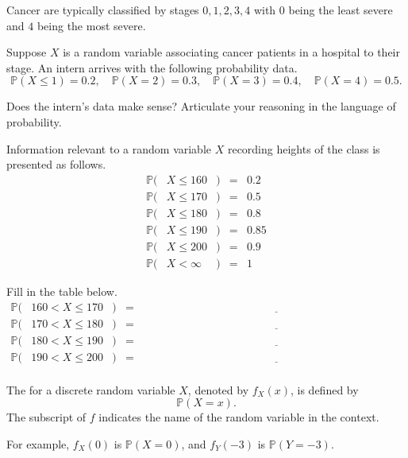 \documentclass[../main.tex]{subfiles}
\begin{document}
\begin{example}
  Cancer are typically classified by stages \(0,1,2,3,4\) with \(0\) being the least severe and \(4\) being the most severe. 

  Suppose \(X\) is a random variable associating cancer patients in a hospital to their stage. An intern arrives with the following probability data. 
  \[
    \mathbb{P}(X \le 1) = 0.2, \quad
    \mathbb{P}(X = 2) = 0.3, \quad
    \mathbb{P}(X = 3) = 0.4, \quad
    \mathbb{P}(X = 4) = 0.5.
  \]

  Does the intern's data make sense? Articulate your reasoning in the language of probability.
\end{example}

\begin{example}
  Information relevant to a random variable \(X\) recording heights of the class is presented as follows.  
  \[
    \begin{array}{rclcl}
      \mathbb{P}(&X \le 160  &) &=& 0.2  \\
      \mathbb{P}(&X \le 170  &) &=& 0.5  \\
      \mathbb{P}(&X \le 180  &) &=& 0.8  \\
      \mathbb{P}(&X \le 190  &) &=& 0.85 \\
      \mathbb{P}(&X \le 200  &) &=& 0.9  \\
      \mathbb{P}(&X < \infty &) &=& 1 
    \end{array}
  \]

  Fill in the table below. 
    \[
      \begin{array}{rclcl}
        \mathbb{P}(&160 < X \le 170 &) &=& \underline{\hspace{4in}}  \\[2ex]
        \mathbb{P}(&170 < X \le 180 &) &=& \underline{\hspace{4in}}  \\[2ex]
        \mathbb{P}(&180 < X \le 190 &) &=& \underline{\hspace{4in}}  \\[2ex]
        \mathbb{P}(&190 < X \le 200 &) &=& \underline{\hspace{4in}}  \\[2ex]
      \end{array}
    \]
\end{example}
\clearpage

\begin{definition}
  The  for a discrete random variable \(X\), denoted by \(f_{X}(x)\), is defined by
  \[
    \mathbb{P}(X = x).
  \]
  The subscript of \(f\) indicates the name of the random variable in the context.

  For example, \(f_{X}(0)\) is \(\mathbb{P}(X = 0)\), and \(f_{Y}(-3)\) is \(\mathbb{P}(Y = -3)\).
\end{definition}
\end{document}
